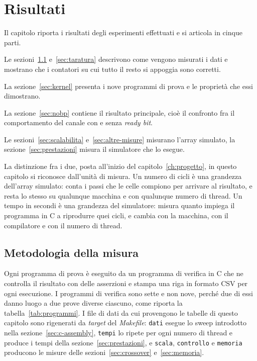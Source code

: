 \chapter{Risultati}
\label{ch:risultati}

Il capitolo riporta i risultati degli esperimenti effettuati 
e si articola in cinque parti. 

Le sezioni~\ref{sec:metodologia} e~\ref{sec:taratura}  descrivono come vengono misurati i dati e mostrano che i contatori su cui tutto il resto si appoggia sono corretti. 

La sezione~\ref{sec:kernel} presenta i nove programmi di prova e le proprietà che
essi dimostrano. 

La sezione~\ref{sec:nobp} contiene il risultato principale,
cioè il confronto fra il comportamento del canale con e senza \emph{ready bit}.

Le sezioni~\ref{sec:scalabilita} e~\ref{sec:altre-misure} misurano l'array
simulato, la sezione~\ref{sec:prestazioni} misura il simulatore che lo
esegue. 

La distinzione fra i due, posta all'inizio del capitolo~\ref{ch:progetto}, in questo capitolo si riconosce dall'unità di
misura. Un numero di cicli è una grandezza dell'array simulato: conta i passi
che le celle compiono per arrivare al risultato, e resta lo stesso su
qualunque macchina e con qualunque numero di thread. Un tempo in secondi è
una grandezza del simulatore: misura quanto impiega il programma in C a
riprodurre quei cicli, e cambia con la macchina, con il compilatore e con il
numero di thread.


\section{Metodologia della misura}
\label{sec:metodologia}

Ogni programma di prova è eseguito da un programma di verifica in C che ne
controlla il risultato con delle asserzioni e stampa una riga in formato CSV per
ogni esecuzione. I programmi di verifica sono sette e non nove, perché due
di essi danno luogo a due prove diverse ciascuno, come riporta la tabella~\ref{tab:programmi}.
I file di dati da cui provengono le tabelle di questo capitolo sono rigenerati
da \emph{target} del \emph{Makefile}: \texttt{dati} esegue lo sweep introdotto nella
sezione~\ref{sec:c-assembly}, \texttt{tempi} lo ripete per ogni numero di
thread e produce i tempi della sezione~\ref{sec:prestazioni}, e
\texttt{scala}, \texttt{controllo} e \texttt{memoria} producono le misure delle
sezioni~\ref{sec:crossover} e~\ref{sec:memoria}.


